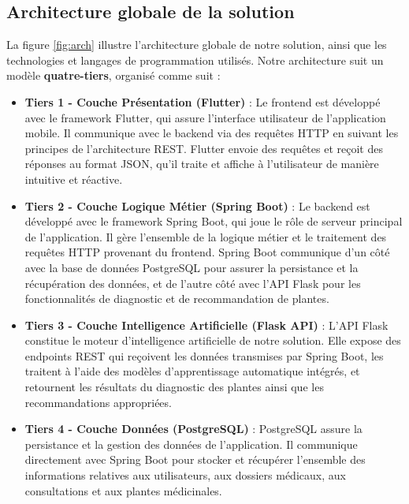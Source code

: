 \subsection{Architecture globale de la solution}
La figure \ref{fig:arch} illustre l'architecture globale de notre solution, 
ainsi que les technologies et langages de programmation utilisés. Notre architecture 
suit un modèle \textbf{quatre-tiers}, organisé comme suit :

\begin{itemize}
    \item \textbf{Tiers 1 - Couche Présentation (Flutter)} : Le frontend est 
    développé avec le framework Flutter, qui assure l'interface utilisateur de 
    l'application mobile. Il communique avec le backend via des requêtes HTTP 
    en suivant les principes de l'architecture REST. Flutter envoie des requêtes 
    et reçoit des réponses au format JSON, qu'il traite et affiche à l'utilisateur 
    de manière intuitive et réactive.

    \item \textbf{Tiers 2 - Couche Logique Métier (Spring Boot)} : Le backend est 
    développé avec le framework Spring Boot, qui joue le rôle de serveur principal 
    de l'application. Il gère l'ensemble de la logique métier et le traitement des 
    requêtes HTTP provenant du frontend. Spring Boot communique d'un côté avec la 
    base de données PostgreSQL pour assurer la persistance et la récupération des 
    données, et de l'autre côté avec l'API Flask pour les fonctionnalités de 
    diagnostic et de recommandation de plantes.

    \item \textbf{Tiers 3 - Couche Intelligence Artificielle (Flask API)} : L'API 
    Flask constitue le moteur d'intelligence artificielle de notre solution. Elle 
    expose des endpoints REST qui reçoivent les données transmises par Spring Boot, 
    les traitent à l'aide des modèles d'apprentissage automatique intégrés, et 
    retournent les résultats du diagnostic des plantes ainsi que les recommandations 
    appropriées.

    \item \textbf{Tiers 4 - Couche Données (PostgreSQL)} : PostgreSQL assure la 
    persistance et la gestion des données de l'application. Il communique 
    directement avec Spring Boot pour stocker et récupérer l'ensemble des 
    informations relatives aux utilisateurs, aux dossiers médicaux, aux 
    consultations et aux plantes médicinales.
\end{itemize}


